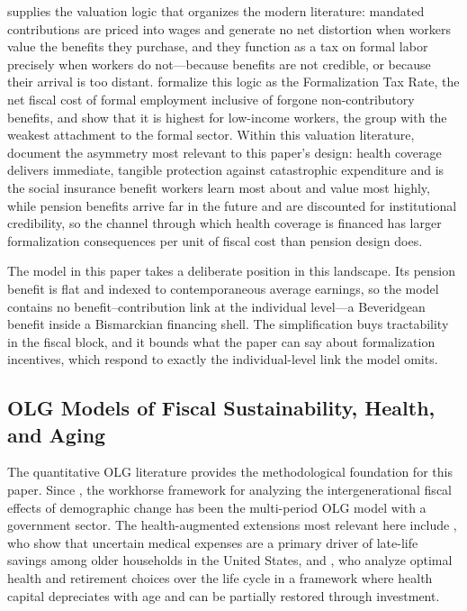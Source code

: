 \documentclass[12pt,a4paper]{article}
\begin{document}
\citet{Summers1989} supplies the valuation logic that organizes the modern literature: mandated contributions are priced into wages and generate no net distortion when workers value the benefits they purchase, and they function as a tax on formal labor precisely when workers do not---because benefits are not credible, or because their arrival is too distant. \citet{WorldBankInformalizing2025} formalize this logic as the Formalization Tax Rate, the net fiscal cost of formal employment inclusive of forgone non-contributory benefits, and show that it is highest for low-income workers, the group with the weakest attachment to the formal sector. Within this valuation literature, \citet{BaezaPackard2006} document the asymmetry most relevant to this paper's design: health coverage delivers immediate, tangible protection against catastrophic expenditure and is the social insurance benefit workers learn most about and value most highly, while pension benefits arrive far in the future and are discounted for institutional credibility, so the channel through which health coverage is financed has larger formalization consequences per unit of fiscal cost than pension design does.

The model in this paper takes a deliberate position in this landscape. Its pension benefit is flat and indexed to contemporaneous average earnings, so the model contains no benefit--contribution link at the individual level---a Beveridgean benefit inside a Bismarckian financing shell. The simplification buys tractability in the fiscal block, and it bounds what the paper can say about formalization incentives, which respond to exactly the individual-level link the model omits.

\subsection{OLG Models of Fiscal Sustainability, Health, and Aging}
\label{subsec:lit_olg}

The quantitative OLG literature provides the methodological foundation for this paper. Since \citet{AuerbachKotlikoff1987}, the workhorse framework for analyzing the intergenerational fiscal effects of demographic change has been the multi-period OLG model with a government sector. The health-augmented extensions most relevant here include \citet{DeNardi2010}, who show that uncertain medical expenses are a primary driver of late-life savings among older households in the United States, and \citet{KuhnFeichtinger2015}, who analyze optimal health and retirement choices over the life cycle in a framework where health capital depreciates with age and can be partially restored through investment.
\end{document}
